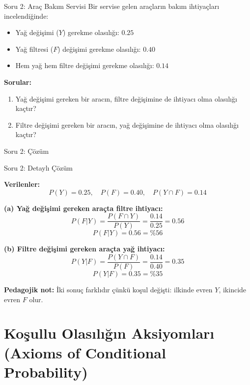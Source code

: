 \documentclass[light]{lutbeamer}
\begin{document}
\begin{frame}{Soru 2: Araç Bakım Servisi}
    Bir servise gelen araçların bakım ihtiyaçları incelendiğinde:
    \begin{itemize}
        \item Yağ değişimi ($Y$) gerekme olasılığı: $0.25$
        \item Yağ filtresi ($F$) değişimi gerekme olasılığı: $0.40$
        \item Hem yağ hem filtre değişimi gerekme olasılığı: $0.14$
    \end{itemize}
    
    \vspace{0.2cm}
    \textbf{Sorular:}
    \begin{enumerate}
        \item[(a)] Yağ değişimi gereken bir aracın, filtre değişimine de ihtiyacı olma olasılığı kaçtır?
        \item[(b)] Filtre değişimi gereken bir aracın, yağ değişimine de ihtiyacı olma olasılığı kaçtır?
    \end{enumerate}
\end{frame}

\begin{frame}{Soru 2: Çözüm}
    \vspace{5cm} %
\end{frame}

\begin{frame}[allowframebreaks]{Soru 2: Detaylı Çözüm}
    \scriptsize
    {\color{red}
    \textbf{Verilenler:}
    \[
    P(Y)=0.25,\quad P(F)=0.40,\quad P(Y\cap F)=0.14
    \]
    
    \vspace{0.1cm}
    \textbf{(a) Yağ değişimi gereken araçta filtre ihtiyacı:}
    \[
    P(F|Y)=\frac{P(F\cap Y)}{P(Y)}=\frac{0.14}{0.25}=0.56
    \]
    \[
    \boxed{P(F|Y)=0.56=\%56}
    \]
    
    \vspace{0.1cm}
    \textbf{(b) Filtre değişimi gereken araçta yağ ihtiyacı:}
    \[
    P(Y|F)=\frac{P(Y\cap F)}{P(F)}=\frac{0.14}{0.40}=0.35
    \]
    \[
    \boxed{P(Y|F)=0.35=\%35}
    \]
    
    \vspace{0.1cm}
    \textbf{Pedagojik not:} İki sonuç farklıdır çünkü koşul değişti:
    ilkinde evren $Y$, ikincide evren $F$ olur.
    }
\end{frame}

\section{Koşullu Olasılığın Aksiyomları (Axioms of Conditional Probability)}
\end{document}
